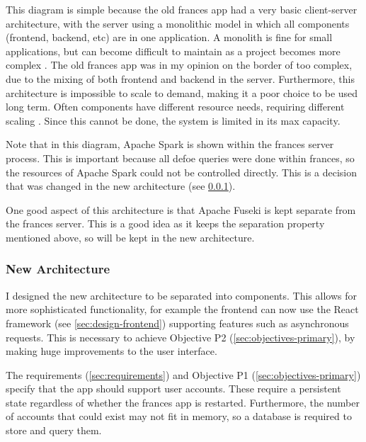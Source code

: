 \documentclass[12pt, letterpaper]{article}
\begin{document}
\begin{flushleft}
This diagram is simple because the old frances app had a very basic client-server architecture, with the server using a monolithic model in which all components (frontend, backend, etc) are in one application. A monolith is fine for small applications, but can  become difficult to maintain as a project becomes more complex \cite{architecture-monoliths}. The old frances app was in my opinion on the border of too complex, due to the mixing of both frontend and backend in the server. Furthermore, this architecture is impossible to scale to demand, making it a poor choice to be used long term. Often components have different resource needs, requiring different scaling \cite{kubernetes-scaling}. Since this cannot be done, the system is limited in its max capacity.
\end{flushleft}

\begin{flushleft}
Note that in this diagram, Apache Spark is shown within the frances server process. This is important because all defoe queries were done within frances, so the resources of Apache Spark could not be controlled directly. This is a decision that was changed in the new architecture (see \ref{sec:design-arch-new}).
\end{flushleft}

\begin{flushleft}
One good aspect of this architecture is that Apache Fuseki is kept separate from the frances server. This is a good idea as it keeps the separation property mentioned above, so will be kept in the new architecture.
\end{flushleft}

\subsubsection{New Architecture}\label{sec:design-arch-new}

\begin{flushleft}
I designed the new architecture to be separated into components. This allows for more sophisticated functionality, for example the frontend can now use the React framework (see \ref{sec:design-frontend}) supporting features such as asynchronous requests. This is necessary to achieve Objective P2 (\ref{sec:objectives-primary}), by making huge improvements to the user interface.
\end{flushleft}

\begin{flushleft}
The requirements (\ref{sec:requirements}) and Objective P1 (\ref{sec:objectives-primary}) specify that the app should support user accounts. These require a persistent state regardless of whether the frances app is restarted. Furthermore, the number of accounts that could exist may not fit in memory, so a database is required to store and query them.
\end{flushleft}
\end{document}
